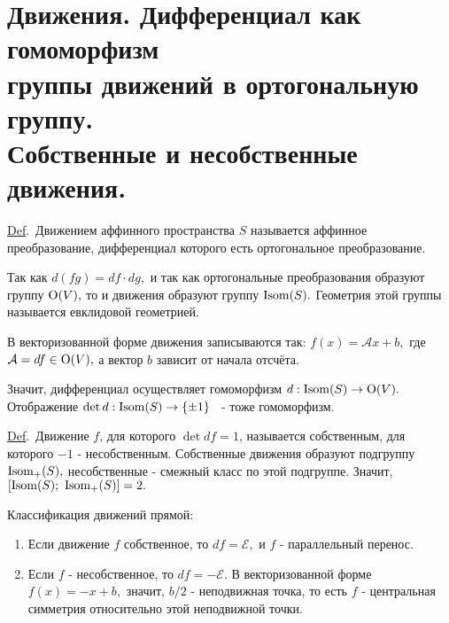 \documentclass[draft]{article}%
\newcommand{\de}{\par\noindent\underline{Def}.\ }%
\newcommand{\ab}{\par\noindent}%
\newcommand{\om}[1]{\mathcal{#1}}
\begin{document}
\section{Движения. Дифференциал как гомоморфизм\\ группы движений в ортогональную группу.\\ Собственные и несобственные движения.}
\label{q47}
\de Движением аффинного пространства $S$ называется аффинное преобразование, дифференциал которого есть ортогональное преобразование.
\ab Так как $d(fg)=df\cdot dg,$ и так как ортогональные преобразования образуют группу ${\rm O}(V),$ то и движения образуют
группу ${\rm Isom}(S).$ Геометрия этой группы называется евклидовой геометрией.
\ab В векторизованной форме движения записываются так: $f(x)=\om{A}x+b,$ где $\om{A}=df\in{\rm O}(V),$ а вектор $b$
зависит от начала отсчёта.
\ab Значит, дифференциал осуществляет гомоморфизм $d:{\rm Isom}(S)\rightarrow{\rm O}(V).$\\ Отображение $\det d:{\rm Isom}(S)\rightarrow\{\pm 1\}$
\ - тоже гомоморфизм.
\de Движение $f$, для которого $\det df=1$, называется собственным, для которого $-1$ - несобственным.
Собственные движения образуют подгруппу ${\rm Isom}_+(S),$ несобственные - смежный класс по этой подгруппе.
Значит, $[{\rm Isom}(S);\ {\rm Isom}_+(S)]=2.$
\ab Классификация движений прямой:
\begin{enumerate}
    \item Если движение $f$ собственное, то $df=\om{E},$ и $f$ - параллельный перенос.
    \item Если $f$ - несобственное, то $df=\om{-E}.$ В векторизованной форме $f(x)=-x+b,$ значит,
    $b/2$ - неподвижная точка, то есть $f$ - центральная симметрия относительно этой неподвижной точки.
\end{enumerate}
\end{document}
